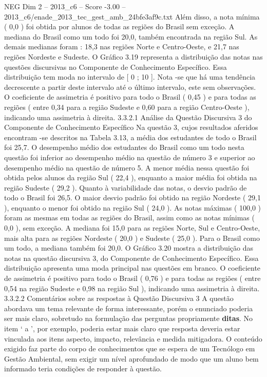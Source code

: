 \begin{textsample}{NEG Dim 2 – 2013\_c6 – Score -3.00 – 2013\_c6/enade\_2013\_tec\_gest\_amb\_24bfe3af9c.txt}
Além disso, a nota mínima ( 0,0 ) foi obtida por alunos de todas as regiões do Brasil sem exceção.
A mediana do Brasil como um todo foi 20,0, também encontrada na região Sul.
As demais medianas foram : 18,3 nas regiões Norte e Centro-Oeste, e 21,7 nas regiões Nordeste e Sudeste.
O Gráfico 3.19 representa a distribuição das notas nas questões discursivas no Componente de Conhecimento Específico.
Essa distribuição tem moda no intervalo de [ 0 ; 10 ].
Nota -se que há uma tendência decrescente a partir deste intervalo até o último intervalo, este sem observações.
O coeficiente de assimetria é positivo para todo o Brasil ( 0,45 ) e para todas as regiões ( entre 0,34 para a região Sudeste e 0,60 para a região Centro-Oeste ), indicando uma assimetria à direita. 3.3.2.1 Análise da Questão Discursiva 3 do Componente de Conhecimento Específico Na questão 3, cujos resultados aferidos encontram -se descritos na Tabela 3.13, a média dos estudantes de todo o Brasil foi 25,7.
O desempenho médio dos estudantes do Brasil como um todo nesta questão foi inferior ao desempenho médio na questão de número 3 e superior ao desempenho médio na questão de número 5.
A menor média nessa questão foi obtida pelos alunos da região Sul ( 22,4 ), enquanto a maior média foi obtida na região Sudeste ( 29,2 ).
Quanto à variabilidade das notas, o desvio padrão de todo o Brasil foi 26,5.
O maior desvio padrão foi obtido na região Nordeste ( 29,1 ), enquanto o menor foi obtido na região Sul ( 24,0 ).
As notas máximas ( 100,0 ) foram as mesmas em todas as regiões do Brasil, assim como as notas mínimas ( 0,0 ), sem exceção.
A mediana foi 15,0 para as regiões Norte, Sul e Centro-Oeste, mais alta para as regiões Nordeste ( 20,0 ) e Sudeste ( 25,0 ).
Para o Brasil como um todo, a mediana também foi 20,0.
O Gráfico 3.20 mostra a distribuição das notas na questão discursiva 3, do Componente de Conhecimento Específico.
Essa distribuição apresenta uma moda principal nas questões em branco.
O coeficiente de assimetria é positivo para todo o Brasil ( 0,76 ) e para todas as regiões ( entre 0,54 na região Sudeste e 0,98 na região Sul ), indicando uma assimetria à direita. 3.3.2.2 Comentários sobre as respostas à Questão Discursiva 3 A questão abordava um tema relevante de forma interessante, porém o enunciado poderia ser mais claro, sobretudo na formulação das perguntas propriamente \textbf{ditas}.
No item ‘ a ’, por exemplo, poderia estar mais claro que resposta deveria estar vinculada aos itens aspecto, impacto, relevância e medida mitigadora.
O conteúdo exigido faz parte do corpo de conhecimentos que se espera de um Tecnólogo em Gestão Ambiental, sem exigir um nível aprofundado de modo que um aluno bem informado teria condições de responder à questão.

\end{textsample}
